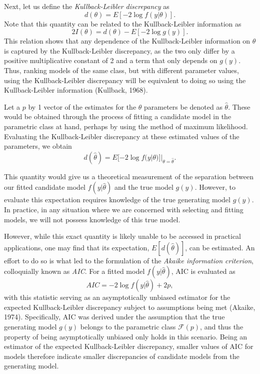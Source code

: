 		Next, let us define the \textit{Kullback-Leibler discrepancy} as
		\begin{equation*}
			d(\theta) = E[-2 \log f(y|\theta)] .
		\end{equation*}
		Note that this quantity can be related to the Kullback-Leibler information as
		\begin{equation*}
			2 I(\theta) = d(\theta) - E \left[ -2 \log g(y) \right].
		\end{equation*}
		This relation shows that any dependence of the Kullback-Leibler information on $\theta$ is captured by the Kullback-Leibler discrepancy, as the two only differ by a positive
		multiplicative constant of 2 and a term that only depends on $g(y)$. Thus, ranking models of the same class, but with different parameter values, using the Kullback-Leibler
		discrepancy will be equivalent to doing so using the Kullback-Leibler information (Kullback, 1968).
		
		Let a $p$ by 1 vector of the estimates for the $\theta$ parameters be denoted as $\hat{\theta}$. These would be obtained through the process of fitting a candidate model in the
		parametric class at hand, perhaps by using the method of maximum likelihood. Evaluating the Kullback-Leibler discrepancy at these estimated values of the parameters, we obtain
		\begin{equation*}
			d(\hat{\theta}) = E [ -2 \log f(y | \theta)]|_{\theta = \hat{\theta}}.
		\end{equation*}

		This quantity would give us a theoretical measurement of the separation between our fitted candidate model $f(y|\hat{\theta})$ and the true model $g(y)$. However, to
		evaluate this expectation requires knowledge of the true generating model $g(y)$. In practice, in any situation where we are concerned with selecting and fitting models,
		we will not possess knowledge of this true model.

		However, while this exact quantity is likely unable to be accessed in practical applications, one may find that its expectation, $E[d(\hat{\theta})]$, can be estimated. An
		effort to do so is what led to the formulation of the \textit{Akaike information criterion}, colloquially known as \textit{AIC}. For a fitted model $f(y|\hat{\theta})$,
		AIC is evaluated as
		\begin{equation*}
			AIC = -2 \log f(y|\hat{\theta}) + 2 p,
		\end{equation*}
		with this statistic serving as an asymptotically unbiased estimator for the expected Kullback-Leibler discrepancy subject to assumptions being met (Akaike, 1974). Specifically, AIC was derived
		under the assumption that the true generating model $g(y)$ belongs to the parametric class $\mathcal{F}(p)$, and thus the property of being asymptotically unbiased only
		holds in this scenario. Being an estimator of the expected Kullback-Leibler discrepancy, smaller values of AIC for models therefore indicate smaller discrepancies of candidate
		models from the generating model.  

